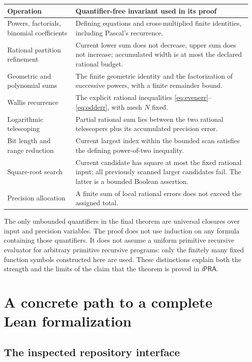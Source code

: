\documentclass[11pt]{article}
\theoremstyle{definition}
\newcommand{\ipra}{\mathsf{iPRA}}
\begin{document}
\begin{longtable}{@{}p{}p{}@{}}
\toprule
Operation & Quantifier-free invariant used in its proof\\
\midrule
\endhead
Powers, factorials, binomial coefficients & Defining equations and
cross-multiplied finite identities, including Pascal's recurrence.\\[4pt]
Rational partition refinement & Current lower sum does not decrease,
upper sum does not increase; accumulated width is at most the declared
rational budget.\\[4pt]
Geometric and polynomial sums & The finite geometric identity and the
factorization of successive powers, with a finite remainder bound.\\[4pt]
Wallis recurrence & The explicit rational inequalities
\eqref{eq:evenerr}--\eqref{eq:odderr}, with mesh $N$ fixed.\\[4pt]
Logarithmic telescoping & Partial rational sum lies between the two
rational telescopers plus its accumulated precision error.\\[4pt]
Bit length and range reduction & Current largest index within the bounded
scan satisfies the defining power-of-two inequality.\\[4pt]
Square-root search & Current candidate has square at most the fixed
rational input; all previously scanned larger candidates fail. The latter
is a bounded Boolean assertion.\\[4pt]
Precision allocation & A finite sum of local rational errors does not
exceed the assigned total.\\
\bottomrule
\end{longtable}

The only unbounded quantifiers in the final theorem are universal
closures over input and precision variables. The proof does not use
induction on any formula containing those quantifiers. It does not assume
a uniform primitive recursive evaluator for arbitrary primitive recursive
programs: only the finitely many fixed function symbols constructed here
are used. These distinctions explain both the strength and the limits of
the claim that the theorem is proved in $\ipra$.

\section{A concrete path to a complete Lean formalization}
\label{sec:lean}

\subsection{The inspected repository interface}
\end{document}
